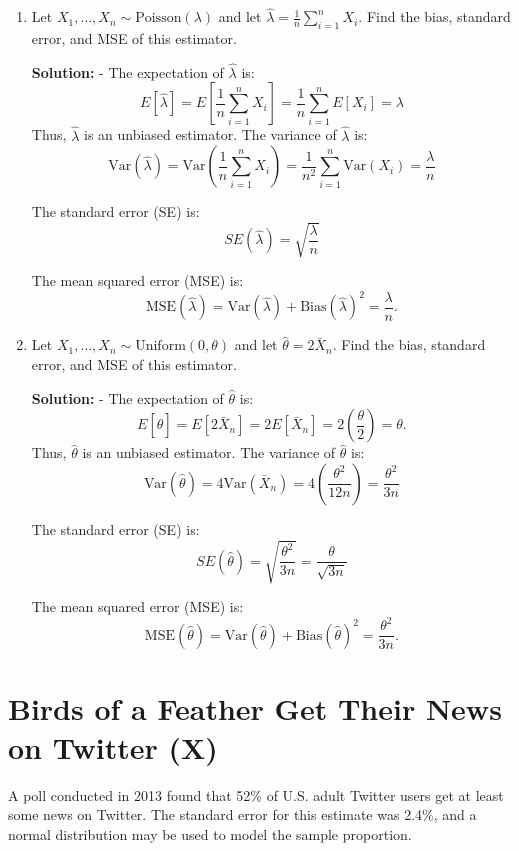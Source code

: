 \documentclass[12pt]{article}
\begin{document}
\begin{enumerate}
    \item Let \( X_1, \dots, X_n \sim \text{Poisson}(\lambda) \) and let \( \hat{\lambda} = \frac{1}{n} \sum_{i=1}^{n} X_i \). Find the bias, standard error, and MSE of this estimator.

\textbf{Solution:}
- The expectation of \( \hat{\lambda} \) is:
\[
E[\hat{\lambda}] = E\left[\frac{1}{n} \sum_{i=1}^{n} X_i \right] = \frac{1}{n} \sum_{i=1}^{n} E[X_i] = \lambda
\]
Thus, \( \hat{\lambda} \) is an unbiased estimator.
The variance of \( \hat{\lambda} \) is:
\[
\text{Var}(\hat{\lambda}) = \text{Var}\left(\frac{1}{n} \sum_{i=1}^{n} X_i \right) = \frac{1}{n^2} \sum_{i=1}^{n} \text{Var}(X_i) = \frac{\lambda}{n}
\]

The standard error (SE) is:
\[
SE(\hat{\lambda}) = \sqrt{\frac{\lambda}{n}}
\]

The mean squared error (MSE) is:
\[
\text{MSE}(\hat{\lambda}) = \text{Var}(\hat{\lambda}) + \text{Bias}(\hat{\lambda})^2 = \frac{\lambda}{n}.
\]

\item  Let \( X_1, \dots, X_n \sim \text{Uniform}(0, \theta) \) and let \( \hat{\theta} = 2\bar{X}_n \). Find the bias, standard error, and MSE of this estimator.

\textbf{Solution:}
- The expectation of \( \hat{\theta} \) is:
\[
E[\hat{\theta}] = E[2\bar{X}_n] = 2E[\bar{X}_n] = 2 \left(\frac{\theta}{2}\right) = \theta.
\]
Thus, \( \hat{\theta} \) is an unbiased estimator.
The variance of \( \hat{\theta} \) is:
\[
\text{Var}(\hat{\theta}) = 4 \text{Var}(\bar{X}_n) = 4 \left(\frac{\theta^2}{12n}\right) = \frac{\theta^2}{3n}
\]

The standard error (SE) is:
\[
SE(\hat{\theta}) = \sqrt{\frac{\theta^2}{3n}} = \frac{\theta}{\sqrt{3n}}
\]

The mean squared error (MSE) is:
\[
\text{MSE}(\hat{\theta}) = \text{Var}(\hat{\theta}) + \text{Bias}(\hat{\theta})^2 = \frac{\theta^2}{3n}.
\]

\end{enumerate}



\section{Birds of a Feather Get Their News on Twitter (X)}

A poll conducted in 2013 found that 52\% of U.S. adult Twitter users get at least some news on Twitter. The standard error for this estimate was 2.4\%, and a normal distribution may be used to model the sample proportion.
\end{document}
